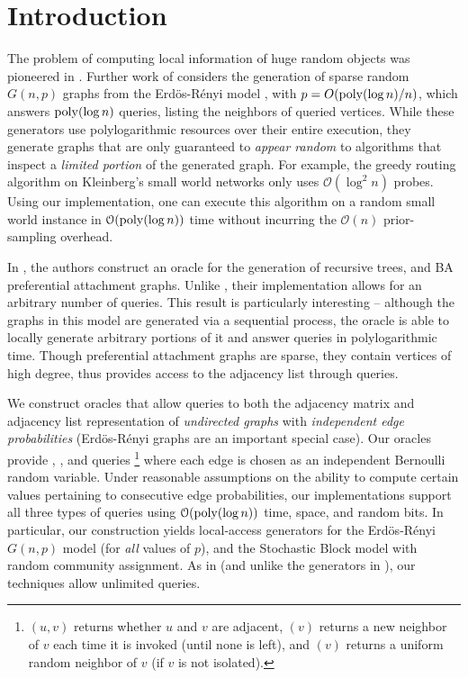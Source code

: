 \section{Introduction}

The problem of computing local information of huge random objects was pioneered in \cite{huge_old,huge}.
Further work of \cite{sparse} considers the generation of sparse random $G(n,p)$ graphs from the Erd\"{o}s-R\'{e}nyi model \cite{er},
with $p = O(\mathrm{poly}(\log n)/n)$, which answers $\mathrm{poly}(\log n)$  queries, listing the neighbors of queried vertices.
While these generators use polylogarithmic resources over their entire execution,
they generate graphs that are  only guaranteed to {\em appear random} to algorithms that inspect a {\em limited portion} of the generated graph.
For example, the greedy routing algorithm on Kleinberg's small world networks \cite{kleinberg} only uses $\mathcal O(\log^2 n)$ probes.
Using our implementation, one can execute this algorithm on a random small world instance
in $\mathcal O(\mathrm{poly}(\log n))$ time without incurring the $\mathcal O(n)$ prior-sampling overhead.

In \cite{reut}, the authors construct an oracle for the generation of recursive trees, and BA preferential attachment graphs.
Unlike \cite{sparse}, their implementation allows for an arbitrary number of queries.
This result is particularly interesting --  although the graphs in this model are generated via a sequential process,
the oracle is able to locally generate arbitrary portions of it and answer queries in polylogarithmic time.
Though preferential attachment graphs are sparse, they contain vertices of high degree,
thus \cite{reut} provides access to the adjacency list through  queries.

We construct oracles that allow queries to both the adjacency matrix and adjacency list representation
of \emph{undirected graphs} with \emph{independent edge probabilities} (Erd\"{o}s-R\'{e}nyi graphs are an important special case).
Our oracles provide , , and  queries
\footnote{$(u,v)$ returns whether $u$ and $v$ are adjacent, $(v)$ returns a new neighbor of $v$
each time it is invoked (until none is left), and $(v)$ returns a uniform random neighbor of $v$ (if $v$ is not isolated).}
where each edge is chosen as an independent Bernoulli random variable.
Under reasonable assumptions on the ability to compute certain values pertaining to consecutive edge probabilities,
our implementations support all three types of queries using $\mathcal{O}(\mathrm{poly}(\log n))$ time, space, and random bits.
In particular, our construction yields local-access generators for the Erd\"{o}s-R\'{e}nyi $G(n,p)$ model (for \emph{all} values of $p$),
and the Stochastic Block model with random community assignment.
As in \cite{reut} (and unlike the generators in \cite{huge_old,huge,sparse}), our techniques allow unlimited queries.

